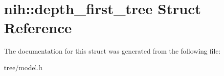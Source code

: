 \hypertarget{structnih_1_1depth__first__tree}{
\section{nih\-:\-:depth\-\_\-first\-\_\-tree \-Struct \-Reference}
\label{structnih_1_1depth__first__tree}
}


\-The documentation for this struct was generated from the following file\-:\begin{DoxyCompactItemize}
\item 
tree/model.\-h\end{DoxyCompactItemize}
